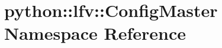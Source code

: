 \hypertarget{namespacepython_1_1lfv_1_1ConfigMaster}{
\section{python::lfv::ConfigMaster Namespace Reference}
\label{namespacepython_1_1lfv_1_1ConfigMaster}
}
